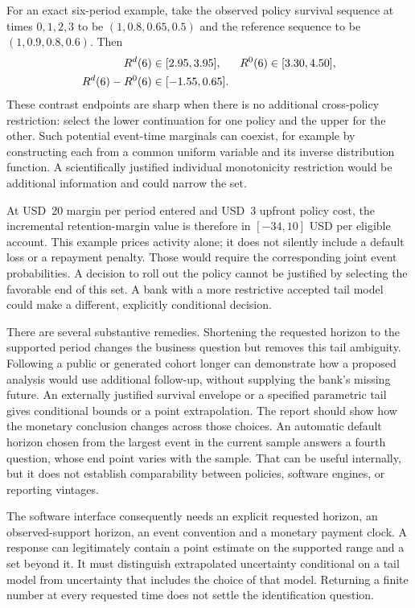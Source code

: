 For an exact six-period example, take the observed policy survival sequence
at times $0,1,2,3$ to be $(1,0.8,0.65,0.5)$ and the reference sequence to be
$(1,0.9,0.8,0.6)$. Then
\begin{align}
 R^d(6)&\in[2.95,3.95],& R^0(6)&\in[3.30,4.50],\notag\\
 R^d(6)-R^0(6)&\in[-1.55,0.65].
 \label{exec17:s5-tail-example}
\end{align}
These contrast endpoints are sharp when there is no additional cross-policy
restriction: select the lower continuation for one policy and the upper for
the other. Such potential event-time marginals can coexist, for example by
constructing each from a common uniform variable and its inverse distribution
function. A scientifically justified individual monotonicity restriction
would be additional information and could narrow the set.

At USD~20 margin per period entered and USD~3 upfront policy cost, the
incremental retention-margin value is therefore in $[-34,10]$ USD per eligible
account. This example prices activity alone; it does not silently include a
default loss or a repayment penalty. Those would require the corresponding
joint event probabilities. A decision to roll out the policy cannot be
justified by selecting the favorable end of this set. A bank with a more
restrictive accepted tail model could make a different, explicitly conditional
decision.\citep{exec17_s5_math}

There are several substantive remedies. Shortening the requested horizon to
the supported period changes the business question but removes this tail
ambiguity. Following a public or generated cohort longer can demonstrate how
a proposed analysis would use additional follow-up, without supplying the
bank's missing future. An externally justified survival envelope or a specified
parametric tail gives conditional bounds or a point extrapolation. The
report should show how the monetary conclusion changes across those choices.
An automatic default horizon chosen from the largest event in the current
sample answers a fourth question, whose end point varies with the sample.
That can be useful internally, but it does not establish comparability between
policies, software engines, or reporting vintages.

The software interface consequently needs an explicit requested horizon,
an observed-support horizon, an event convention and a monetary payment clock.
A response can legitimately contain a point estimate on the supported range
and a set beyond it. It must distinguish extrapolated uncertainty conditional
on a tail model from uncertainty that includes the choice of that model.
Returning a finite number at every requested time does not settle the
identification question.

